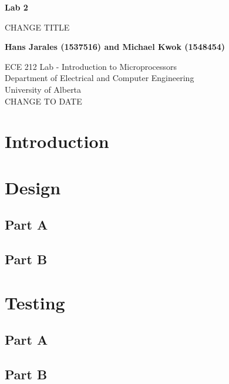 \documentclass[12pt]{article}
\begin{document}
\begin{titlepage}
    \begin{center}
    \vspace*{1cm}
    
    \textbf{Lab 2}

    \vspace{0.5cm}

     CHANGE TITLE
    
    \vspace{1.5cm}

    \textbf{Hans Jarales (1537516) and Michael Kwok (1548454)}

    \vfill
            
    ECE 212 Lab - Introduction to Microprocessors\\
    Department of Electrical and Computer Engineering\\
    University of Alberta\\
    CHANGE TO DATE    

   \end{center}
\end{titlepage}

\tableofcontents
\pagebreak

\section{Introduction}



\section{Design}
\subsection{Part A}

\subsection{Part B}

\section{Testing}
\subsection{Part A}

\subsection{Part B}
\end{document}
